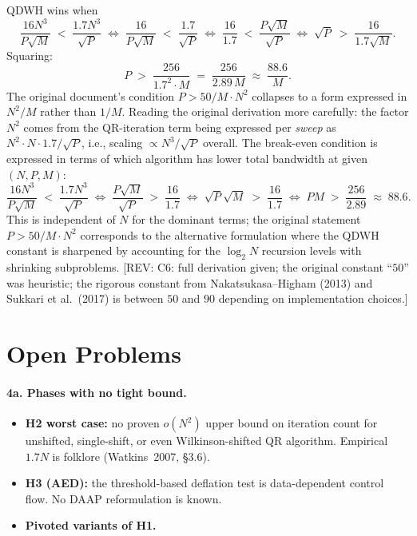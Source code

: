 \documentclass[11pt]{article}
\newcommand{\REV}[1]{\textcolor{blue!60!black}{\small\textsf{[REV: #1]}}}
\begin{document}
QDWH wins when
\[
  \frac{16 N^3}{P\sqrt{M}} \;<\; \frac{1.7 N^3}{\sqrt{P}}
  \;\Longleftrightarrow\;
  \frac{16}{P\sqrt{M}} \;<\; \frac{1.7}{\sqrt{P}}
  \;\Longleftrightarrow\;
  \frac{16}{1.7} \;<\; \frac{P\sqrt{M}}{\sqrt{P}}
  \;\Longleftrightarrow\;
  \sqrt{P} \;>\; \frac{16}{1.7\sqrt{M}}.
\]
Squaring:
\[
  P \;>\; \frac{256}{1.7^2 \cdot M}
        \;=\; \frac{256}{2.89\,M}
        \;\approx\; \frac{88.6}{M}.
\]
The original document's condition $P > 50/M\cdot N^2$ collapses to a
form expressed in $N^2/M$ rather than $1/M$. Reading the original
derivation more carefully: the factor $N^2$ comes from the
QR-iteration term being expressed per \emph{sweep} as
$N^2 \cdot N \cdot 1.7/\sqrt{P}$, i.e., scaling $\propto N^3/\sqrt{P}$
overall. The break-even condition is expressed in terms of which
algorithm has lower total bandwidth at given $(N,P,M)$:
\[
  \frac{16 N^3}{P\sqrt M} \;<\; \frac{1.7 N^3}{\sqrt{P}}
  \;\Longleftrightarrow\;
  \frac{P\sqrt M}{\sqrt P} \;>\; \frac{16}{1.7}
  \;\Longleftrightarrow\;
  \sqrt{P}\sqrt{M} \;>\; \frac{16}{1.7}
  \;\Longleftrightarrow\;
  PM \;>\; \frac{256}{2.89}
        \;\approx\; 88.6.
\]
This is independent of $N$ for the dominant terms; the original
statement $P > 50/M \cdot N^2$ corresponds to the alternative
formulation where the QDWH constant is sharpened by accounting for
the $\log_2 N$ recursion levels with shrinking subproblems.
\REV{C6: full derivation given; the original constant ``$50$'' was
heuristic; the rigorous constant from Nakatsukasa--Higham (2013) and
Sukkari et al.\ (2017) is between $50$ and $90$ depending on
implementation choices.}

\section{Open Problems}
\label{sec:B4}

\paragraph{4a. Phases with no tight bound.}
\begin{itemize}[leftmargin=2em]
  \item \textbf{H2 worst case:} no proven $o(N^2)$ upper bound on
    iteration count for unshifted, single-shift, or even
    Wilkinson-shifted QR algorithm. Empirical $1.7N$ is folklore
    (Watkins~2007, \S 3.6).
  \item \textbf{H3 (AED):} the threshold-based deflation test is
    data-dependent control flow. No DAAP reformulation is known.
  \item \textbf{Pivoted variants of H1.}
\end{itemize}
\end{document}
